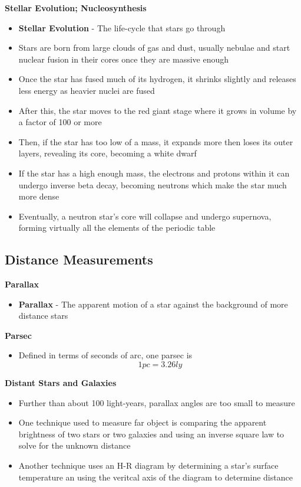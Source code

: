 \textbf{Stellar Evolution; Nucleosynthesis}
\begin{itemize}
    \item \textbf{Stellar Evolution} - The life-cycle that stars go through
    \item Stars are born from large clouds of gas and dust, usually nebulae and start nuclear fusion in their cores once they are massive enough
    \item Once the star has fused much of its hydrogen, it shrinks slightly and releases less energy as heavier nuclei are fused
    \item After this, the star moves to the red giant stage where it grows in volume by a factor of 100 or more
    \item Then, if the star has too low of a mass, it expands more then loses its outer layers, revealing its core, becoming a white dwarf
    \item If the star has a high enough mass, the electrons and protons within it can undergo inverse beta decay, becoming neutrons which make the star much more dense 
    \item Eventually, a neutron star's core will collapse and undergo supernova, forming virtually all the elements of the periodic table
\end{itemize}

\subsection{Distance Measurements}
\textbf{Parallax}
\begin{itemize}
    \item \textbf{Parallax} - The apparent motion of a star against the background of more distance stars
\end{itemize}

\textbf{Parsec}
\begin{itemize}
    \item Defined in terms of seconds of arc, one parsec is \[1pc=3.26ly\]
\end{itemize}

\textbf{Distant Stars and Galaxies}
\begin{itemize}
    \item Further than about 100 light-years, parallax angles are too small to measure
    \item One technique used to measure far object is comparing the apparent brightness of two stars or two galaxies and using an inverse square law to solve for the unknown distance
    \item Another technique uses an H-R diagram by determining a star's surface temperature an using the veritcal axis of the diagram to determine distance
\end{itemize}


